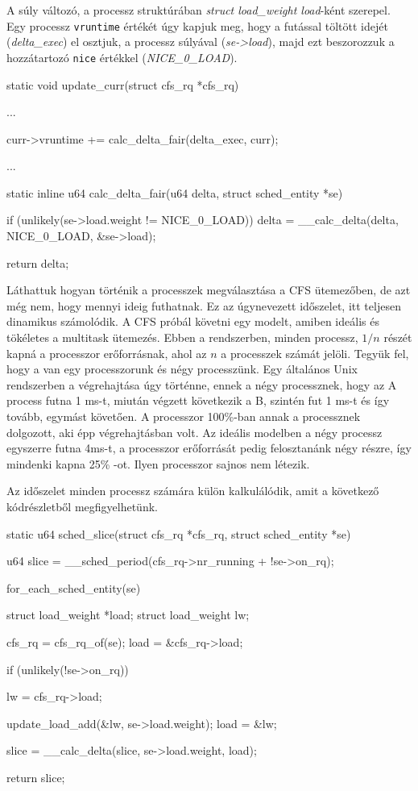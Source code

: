 A súly változó, a processz struktúrában \textit{struct load\_weight load}-ként szerepel.
Egy processz \texttt{vruntime} értékét úgy kapjuk meg, hogy a futással töltött idejét (\textit{delta\_exec}) el osztjuk, a processz súlyával (\textit{se->load}), majd ezt beszorozzuk a hozzátartozó \texttt{nice} értékkel (\textit{NICE\_0\_LOAD}).
\begin{cpp} 
static void update_curr(struct cfs_rq *cfs_rq)
{
	...

	curr->vruntime += calc_delta_fair(delta_exec, curr);

	...
}
static inline u64 calc_delta_fair(u64 delta, struct sched_entity *se)
{
	if (unlikely(se->load.weight != NICE_0_LOAD))
		delta = __calc_delta(delta, NICE_0_LOAD, &se->load);

	return delta;
}
\end{cpp}

Láthattuk hogyan történik a processzek megválasztása a CFS ütemezőben, de azt még nem, hogy mennyi ideig futhatnak.
Ez az úgynevezett időszelet, itt teljesen dinamikus számolódik.
A CFS próbál követni egy modelt, amiben ideális és tökéletes a multitask ütemezés. Ebben a rendszerben, minden processz, $1/n$ részét kapná a processzor erőforrásnak, ahol az $n$ a processzek számát jelöli. 
Tegyük fel, hogy a van egy processzorunk és négy processzünk.
Egy általános Unix rendszerben a végrehajtása úgy történne, ennek a négy processznek, hogy az A process futna 1 ms-t, miután végzett következik a B, szintén fut 1 ms-t és így tovább, egymást követően. A processzor 100\%-ban annak a processznek dolgozott, aki épp végrehajtásban volt.
Az ideális modelben a négy processz egyszerre futna 4ms-t, a processzor erőforrását pedig felosztanánk négy részre, így mindenki kapna 25\% -ot. Ilyen processzor sajnos nem létezik.

Az időszelet minden processz számára külön kalkulálódik, amit a következő kódrészletből megfigyelhetünk.

\begin{cpp}
static u64 sched_slice(struct cfs_rq *cfs_rq, struct sched_entity *se)
{
	u64 slice = __sched_period(cfs_rq->nr_running + !se->on_rq);

	for_each_sched_entity(se) {
		struct load_weight *load;
		struct load_weight lw;

		cfs_rq = cfs_rq_of(se);
		load = &cfs_rq->load;

		if (unlikely(!se->on_rq)) {
			lw = cfs_rq->load;

			update_load_add(&lw, se->load.weight);
			load = &lw;
		}
		slice = __calc_delta(slice, se->load.weight, load);
	}
	return slice;
}
\end{cpp}

